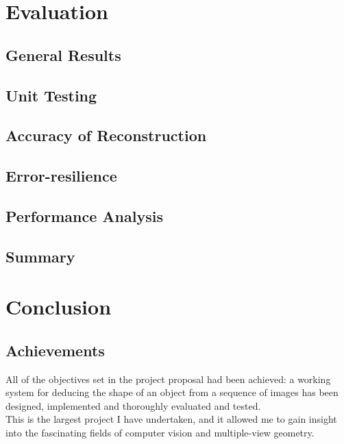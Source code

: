 \documentclass[12pt,a4paper,twoside,openright]{report}
\begin{document}
\chapter{Evaluation}
\section{General Results}
\section{Unit Testing}
\section{Accuracy of Reconstruction}
\section{Error-resilience}
\section{Performance Analysis}
\section{Summary}

\chapter{Conclusion}


\section{Achievements}
All of the objectives set in the project proposal had been achieved: a working system for deducing the shape of an object from a sequence of images has been designed, implemented and thoroughly evaluated and tested.\\
\linebreak
This is the largest project I have undertaken, and it allowed me to gain insight into the fascinating fields of computer vision and multiple-view geometry. 
\end{document}
